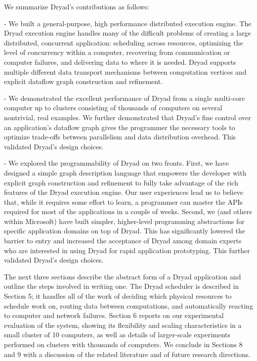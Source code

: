 \documentclass[
]{article}
\begin{document}
We summarize Dryad's contributions as follows:

- We built a general-purpose, high performance distributed execution
engine. The Dryad execution engine handles many of the difficult
problems of creating a large distributed, concurrent application:
scheduling across resources, optimizing the level of concurrency within
a computer, recovering from communication or computer failures, and
delivering data to where it is needed. Dryad supports multiple different
data transport mechanisms between computation vertices and explicit
dataflow graph construction and refinement.

- We demonstrated the excellent performance of Dryad from a single
multi-core computer up to clusters consisting of thousands of computers
on several nontrivial, real examples. We further demonstrated that
Dryad's fine control over an application's dataflow graph gives the
programmer the necessary tools to optimize trade-offs between
parallelism and data distribution overhead. This validated Dryad's
design choices.

- We explored the programmability of Dryad on two fronts. First, we have
designed a simple graph description language that empowers the developer
with explicit graph construction and refinement to fully take advantage
of the rich features of the Dryad execution engine. Our user experiences
lead us to believe that, while it requires some effort to learn, a
programmer can master the APIs required for most of the applications in
a couple of weeks. Second, we (and others within Microsoft) have built
simpler, higher-level programming abstractions for specific application
domains on top of Dryad. This has significantly lowered the barrier to
entry and increased the acceptance of Dryad among domain experts who are
interested in using Dryad for rapid application prototyping. This
further validated Dryad's design choices.

The next three sections describe the abstract form of a Dryad
application and outline the steps involved in writing one. The Dryad
scheduler is described in Section 5; it handles all of the work of
deciding which physical resources to schedule work on, routing data
between computations, and automatically reacting to computer and network
failures. Section 6 reports on our experimental evaluation of the
system, showing its flexibility and scaling characteristics in a small
cluster of 10 computers, as well as details of larger-scale experiments
performed on clusters with thousands of computers. We conclude in
Sections 8 and 9 with a discussion of the related literature and of
future research directions.
\end{document}
